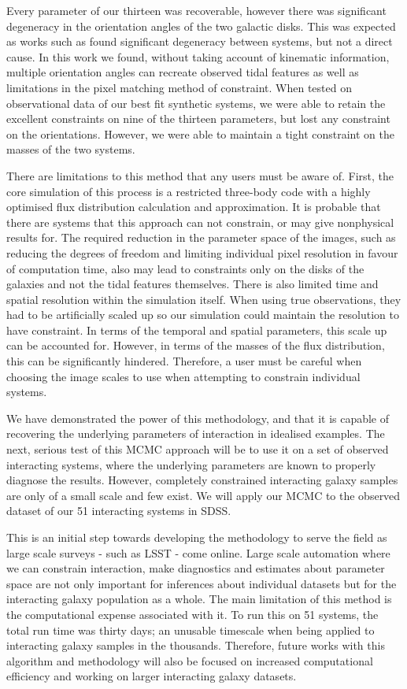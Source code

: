 Every parameter of our thirteen was recoverable, however there was significant degeneracy in the orientation angles of the two galactic disks. This was expected as works such as \citet{2010ASPC..423..227S} found significant degeneracy between systems, but not a direct cause. In this work we found, without taking account of kinematic information, multiple orientation angles can recreate observed tidal features as well as limitations in the pixel matching method of constraint. When tested on observational data of our best fit synthetic systems, we were able to retain the excellent constraints on nine of the thirteen parameters, but lost any constraint on the orientations. However, we were able to maintain a tight constraint on the masses of the two systems. 

There are limitations to this method that any users must be aware of. First, the core simulation of this process is a restricted three-body code with a highly optimised flux distribution calculation and approximation. It is probable that there are systems that this approach can not constrain, or may give nonphysical results for. The required reduction in the parameter space of the images, such as reducing the degrees of freedom and limiting individual pixel resolution in favour of computation time, also may lead to constraints only on the disks of the galaxies and not the tidal features themselves. There is also limited time and spatial resolution within the simulation itself. When using true observations, they had to be artificially scaled up so our simulation could maintain the resolution to have constraint. In terms of the temporal and spatial parameters, this scale up can be accounted for. However, in terms of the masses of the flux distribution, this can be significantly hindered. Therefore, a user must be careful when choosing the image scales to use when attempting to constrain individual systems. 

We have demonstrated the power of this methodology, and that it is capable of recovering the underlying parameters of interaction in idealised examples. The next, serious test of this MCMC approach will be to use it on a set of observed interacting systems, where the underlying parameters are known to properly diagnose the results. However, completely constrained interacting galaxy samples are only of a small scale and few exist. We will apply our MCMC to the observed dataset of our 51 interacting systems in SDSS.

This is an initial step towards developing the methodology to serve the field as large scale surveys - such as LSST - come online. Large scale automation where we can constrain interaction, make diagnostics and estimates about parameter space are not only important for inferences about individual datasets but for the interacting galaxy population as a whole. The main limitation of this method is the computational expense associated with it. To run this on 51 systems, the total run time was thirty days; an unusable timescale when being applied to interacting galaxy samples in the thousands. Therefore, future works with this algorithm and methodology will also be focused on increased computational efficiency and working on larger interacting galaxy datasets. 

